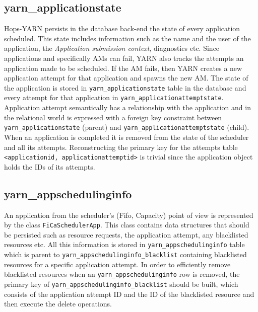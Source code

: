 \subsection{yarn\_applicationstate}
\label{ssec:impl_fk_appstate}
Hops-YARN persists in the database back-end the state of every
application scheduled. This state includes information such as the
name and the user of the application, the \emph{Application submission
  context}, diagnostics etc. Since applications and specifically AMs
can fail, YARN also tracks the attempts an application made to be scheduled.
If the AM fails, then YARN creates a new application attempt
for that application and spawns the new AM. The state of the
application is stored in \texttt{yarn\_applicationstate} table in the
database and every attempt for that application in
\texttt{yarn\_applicationattemptstate}. Application attempt
semantically has a relationship with the application and in the
relational world is expressed with a foreign key constraint
between \texttt{yarn\_applicationstate} (parent) and
\texttt{yarn\_applicationattemptstate} (child). When an application
is completed it is removed from the state of the scheduler and all
its attempts. Reconstructing the primary key for the attempts table
\texttt{<applicationid, applicationattemptid>} is trivial since the
application object holds the IDs of its attempts.

\subsection{yarn\_appschedulinginfo}
\label{ssec:impl_fk_appschedulinginfo}
An application from the scheduler's (Fifo, Capacity) point of view is
represented by the class \texttt{FiCaSchedulerApp}. This class
contains data structures that should be persisted such as resource
requests, the application attempt, any blacklisted resources etc. All
this information is stored in \texttt{yarn\_appschedulinginfo} table
which is parent to \texttt{yarn\_appschedulinginfo\_blacklist}
containing blacklisted resources for a specific application
attempt. In order to efficiently remove blacklisted resources when an
\texttt{yarn\_appschedulinginfo} row is removed, the primary key of
\texttt{yarn\_appschedulinginfo\_blacklist} should be built, which
consists of the application attempt ID and the ID of the blacklisted
resource and then execute the delete operations.

